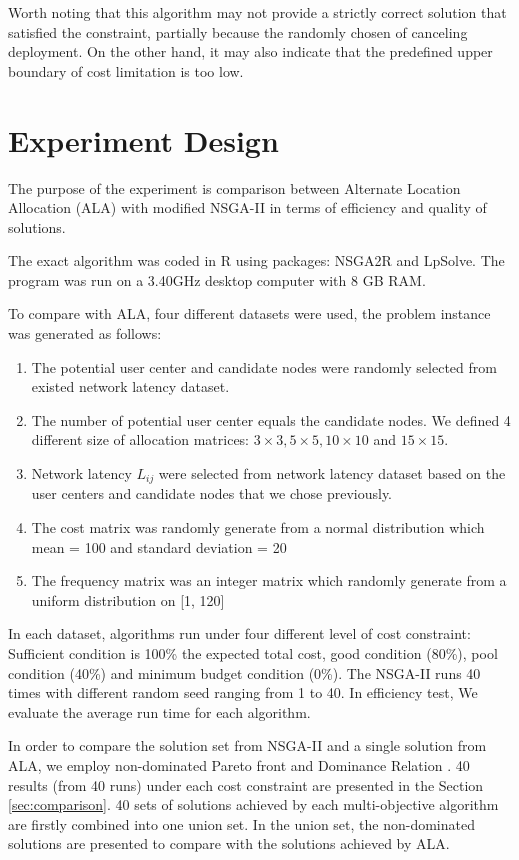 \documentclass[twoside]{article}
\begin{document}
Worth noting that this algorithm may not provide a strictly correct solution that satisfied the constraint, 
partially because the randomly chosen of canceling deployment. On the other hand, it may also indicate that 
the predefined upper boundary of cost limitation is too low.

\section{Experiment Design}
The purpose of the experiment is comparison between Alternate Location Allocation (ALA) with modified NSGA-II in terms of efficiency and quality of solutions. 

The exact algorithm was coded in R using packages: NSGA2R and LpSolve. The program was run on a 3.40GHz 
desktop computer with 8 GB RAM.

To compare with ALA, four different datasets were used, the problem instance was generated as follows:
\begin{enumerate}
	\item The potential user center and candidate nodes were randomly selected from existed network latency dataset. 
	\item The number of potential user center equals the candidate nodes. We defined 4 different size of allocation matrices:
			$3 \times 3, 5 \times 5, 10 \times 10$ and $15 \times 15$.
	\item Network latency $L_{ij}$ were selected from network latency dataset based on the user centers and candidate nodes that
		we chose previously.
	\item The cost matrix was randomly generate from a normal distribution which mean = 100 and standard deviation = 20
	\item The frequency matrix was an integer matrix which randomly generate from a uniform distribution on [1, 120]
\end{enumerate}

In each dataset, algorithms run under four different level of cost constraint: Sufficient condition is 100\% the expected total cost, 
good condition (80\%), pool condition (40\%) and minimum budget condition (0\%). The NSGA-II runs 40 times with different random 
seed ranging from 1 to 40. In efficiency test, We evaluate the average run time for each algorithm. 

In order to compare the solution set from  NSGA-II and a single solution from ALA, we employ non-dominated Pareto front
\cite{Xue:2012:MPS:2330163.2330175} and Dominance Relation \cite{1688438}.
40 results (from 40 runs) under each cost constraint are presented in the Section \ref{sec:comparison}. 40 sets of solutions 
achieved by each multi-objective algorithm are firstly combined into one union set. In the union set, the non-dominated solutions 
are presented to compare with the solutions achieved by ALA.
\end{document}
